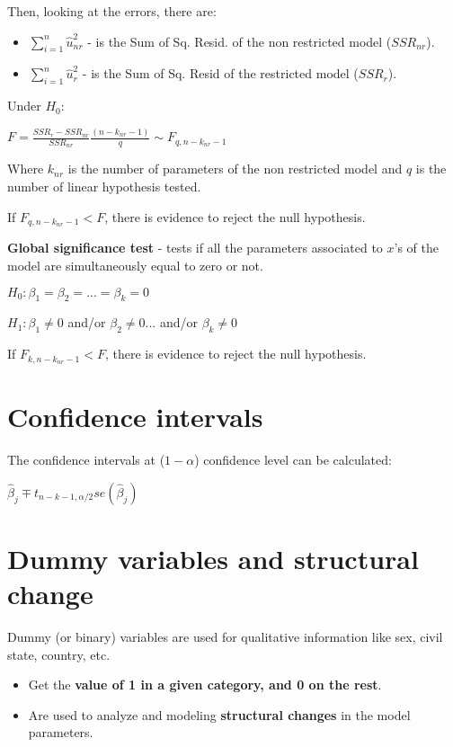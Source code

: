 \documentclass[10pt, a4paper, landscape]{extarticle}
\begin{document}
\begin{multicols}{3}
Then, looking at the errors, there are:

\begin{itemize}[leftmargin=*]
\item \textbf{$\sum_{i=1}^n \hat{u}_{nr}^2$} - is the Sum of Sq. Resid. of the non restricted model ($SSR_{nr}$).
\item \textbf{$\sum_{i=1}^n \hat{u}_r^2$} - is the Sum of Sq. Resid of the restricted model ($SSR_r$).
\end{itemize}

Under $H_0$:

\begin{center}
$F = \frac{SSR_r - SSR_{nr}}{SSR_{nr}} \frac{(n-k_{nr}-1)}{q} \sim F_{q, n-k_{nr}-1}$
\end{center}

Where $k_{nr}$ is the number of parameters of the non restricted model and $q$ is the number of linear hypothesis tested.

If $F_{q, n-k_{nr}-1} < F$, there is evidence to reject the null hypothesis.

\textbf{Global significance test} - tests if all the parameters associated to $x$'s of the model are simultaneously equal to zero or not.

$H_0: \beta_1 = \beta_2 = ... = \beta_k = 0$

$H_1: \beta_1 \neq 0$ and/or $\beta_2 \neq 0 ...$ and/or $\beta_k \neq 0$

If $F_{k, n-k_{nr}-1} < F$, there is evidence to reject the null hypothesis.

\section*{Confidence intervals}

The confidence intervals at ($1 - \alpha$) confidence level can be calculated:

\begin{center}
$\hat{\beta}_j \mp t_{n-k-1, \alpha/2} se(\hat{\beta}_j)$
\end{center}

\section*{Dummy variables and structural change}

Dummy (or binary) variables are used for qualitative information like sex, civil state, country, etc.

\begin{itemize}[leftmargin=*]
\item Get the \textbf{value of 1 in a given category, and 0 on the rest}.
\item Are used to analyze and modeling \textbf{structural changes} in the model parameters.
\end{itemize}


\end{multicols}
\end{document}
